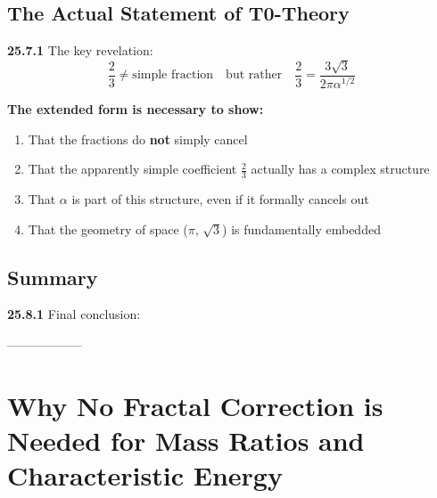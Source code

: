 \documentclass[12pt,a4paper]{article}
\begin{document}
\subsection{The Actual Statement of T0-Theory}

\noindent \textbf{25.7.1} The key revelation:
\[
\boxed{
	\frac{2}{3} \neq \text{simple fraction} \quad \text{but rather} \quad \frac{2}{3} = \frac{3\sqrt{3}}{2\pi\alpha^{1/2}}
}
\]

\begin{tcolorbox}[colback=green!5!white,colframe=green!75!black]
	\textbf{The extended form is necessary to show:}
	\begin{enumerate}
		\item That the fractions do \textbf{not} simply cancel
		\item That the apparently simple coefficient $\frac{2}{3}$ actually has a complex structure
		\item That $\alpha$ is part of this structure, even if it formally cancels out
		\item That the geometry of space ($\pi$, $\sqrt{3}$) is fundamentally embedded
	\end{enumerate}
\end{tcolorbox}

\subsection{Summary}

\noindent \textbf{25.8.1} Final conclusion:
\begin{center}
\end{center}
------------------

	
	\section*{Why No Fractal Correction is Needed for Mass Ratios and Characteristic Energy}
	
\end{document}
